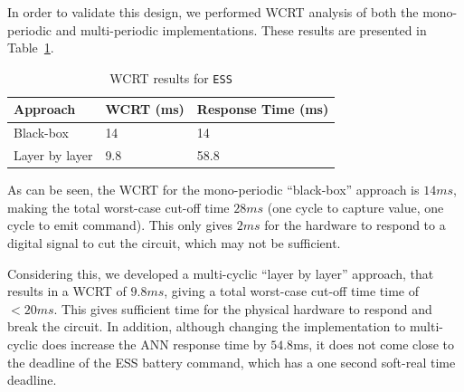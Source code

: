 In order to validate this design, we performed \ac{WCRT} analysis of
both the mono-periodic and multi-periodic implementations. 
These results are presented in Table~\ref{tbl:res-ess}.

\begin{table}[H]
	\centering
	\caption{\ac{WCRT} results for \texttt{ESS}}
	\label{tbl:res-ess}
	\begin{tabular}{|l|l|l|}
		\hline
		Approach         & WCRT (ms) & Response Time (ms)\\ \hline
		Black-box        & 14   & 14 \\ 
		Layer by layer   & 9.8  & 58.8 \\ \hline
	\end{tabular}
\end{table}

As can be seen, the \ac{WCRT} for the mono-periodic ``black-box''
approach is $14ms$, 
making the total worst-case cut-off time $28ms$ (one cycle to capture value, one cycle to emit command).
This only gives $2ms$ for the hardware to respond to a digital signal
to cut the circuit, which may not be sufficient.

Considering this, we developed  a multi-cyclic ``layer by layer''
approach, that results in a \ac{WCRT} of $9.8ms$, 
giving a total worst-case cut-off time time of $<20ms$. 
This gives sufficient time for the physical hardware to respond and break the circuit.
In addition, although changing the implementation to multi-cyclic does increase the \ac{ANN} response time by $54.8$ms, it does not
come close to the deadline of the \ac{ESS} battery command, which has a one second soft-real time deadline.

